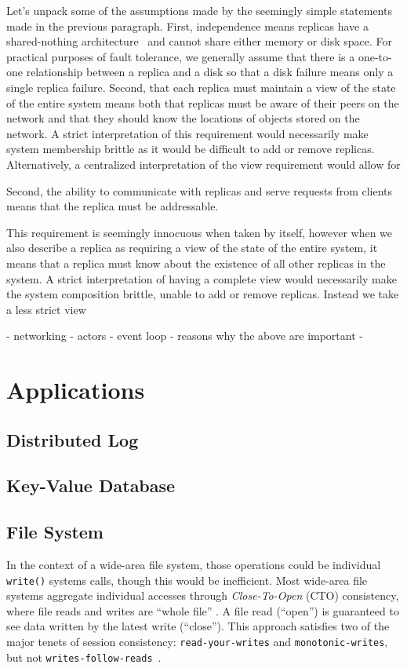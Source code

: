 Let's unpack some of the assumptions made by the seemingly simple statements made in the previous paragraph.
First, independence means replicas have a shared-nothing architecture~\cite{shared_nothing} and cannot share either memory or disk space.
For practical purposes of fault tolerance, we generally assume that there is a one-to-one relationship between a replica and a disk so that a disk failure means only a single replica failure.
Second, that each replica must maintain a view of the state of the entire system means both that replicas must be aware of their peers on the network and that they should know the locations of objects stored on the network.
A strict interpretation of this requirement would necessarily make system membership brittle as it would be difficult to add or remove replicas.
Alternatively, a centralized interpretation of the view requirement would allow for


Second, the ability to communicate with replicas and serve requests from clients means that the replica must be addressable.


This requirement is seemingly innocuous when taken by itself, however when we also describe a replica as requiring a view of the state of the entire system, it means that a replica must know about the existence of all other replicas in the system.
A strict interpretation of having a complete view would necessarily make the system composition brittle, unable to add or remove replicas.
Instead we take a less strict view


- networking
- actors
- event loop
- reasons why the above are important
-

\section{Applications}

\subsection{Distributed Log}

\subsection{Key-Value Database}

\subsection{File System}

In the context of a wide-area file system, those operations could be individual
\texttt{write()} systems calls, though this would be inefficient.
Most wide-area file systems aggregate individual accesses through
\textit{Close-To-Open} (CTO) consistency, where file reads and writes are
``whole file'' \cite{afs,coda,lbfs}.
A file read (``open'') is guaranteed to see data written by the latest write
(``close'').
This approach satisfies two of the major tenets of session consistency:
\texttt{read-your-writes} and
\texttt{monotonic-writes}, but not
\texttt{writes-follow-reads}~\cite{bermbach_consistency_2013,anti_entropy,eventual_consistency}.


